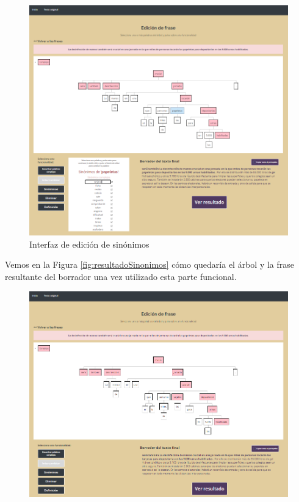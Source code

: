 \begin{itemize}
\begin{figure}[h!]
	
	\includegraphics[scale=0.6]{Imagenes/Figuras/EdicionSinonimos}
	
	
	\caption{Interfaz de edición de sinónimos}
	\label{fig:edicionSinonimos}
\end{figure}



Vemos en la Figura \ref{fig:resultadoSinonimos} cómo quedaría el árbol y la frase resultante del borrador una vez utilizado esta parte funcional.
	 \begin{figure}[h!]
	\centering
	
	
	\includegraphics[scale=0.57]{Imagenes/Figuras/ResultadoSinonimos}
	

\end{figure}
\end{itemize}
